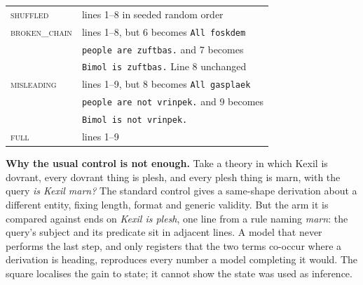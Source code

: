 \documentclass[10pt,twocolumn]{article}
\begin{document}
\begin{table}[tb]
\begin{minipage}[t]{0.55\textwidth}
\begin{tabular}{@{}ll@{}}
\textsc{shuffled}    & lines 1--8 in seeded random order \\
\textsc{broken\_chain} & lines 1--8, but 6 becomes \texttt{All foskdem} \\
                     & \texttt{people are zuftbas.} and 7 becomes \\
                     & \texttt{Bimol is zuftbas.} Line 8 unchanged \\
\textsc{misleading}  & lines 1--9, but 8 becomes \texttt{All gasplaek} \\
                     & \texttt{people are not vrinpek.} and 9 becomes \\
                     & \texttt{Bimol is not vrinpek.} \\
\textsc{full}        & lines 1--9 \\
\bottomrule
\end{tabular}
\end{minipage}
\end{table}

\textbf{Why the usual control is not enough.} Take a theory in which Kexil is
dovrant, every dovrant thing is plesh, and every plesh thing is marn, with the
query \emph{is Kexil marn?} The standard control gives a same-shape derivation
about a different entity, fixing length, format and generic validity. But the
arm it is compared against ends on \emph{Kexil is plesh}, one line from a rule
naming \emph{marn}: the query's subject and its predicate sit in adjacent lines.
A model that never performs the last step, and only registers that the two terms
co-occur where a derivation is heading, reproduces every number a model
completing it would. The square localises the gain to state; it cannot show the
state was used as inference.
\end{document}
